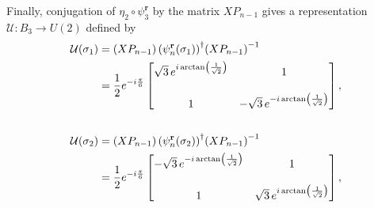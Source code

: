 \begin{example}
    Finally, conjugation of $\eta_2\circ\psi_3^\textbf{r}$ by the matrix $XP_{n-1}$ gives a representation $\mathcal{U}:B_3\to U(2)$ defined by
    \begin{align}
        \begin{split}    
        \mathcal{U}(\sigma_1) &= \left( X P_{n-1} \right){\left( \psi_n^\mathbf{r} (\sigma_1)\right)}^\dagger\iv{\left( X P_{n-1} \right)} \\
        &= \frac{1}{2}e^{-i\frac{\pi}{6}}\begin{bmatrix}
            \sqrt{3}\,e^{i\arctan\left( \frac{1}{\sqrt{2}} \right)} & 1 \\
            \\
            1 & -\sqrt{3}\,e^{-i\arctan\left( \frac{1}{\sqrt{2}} \right)}
        \end{bmatrix},\end{split} \\ 
        \nonumber \\
        \begin{split}
        \mathcal{U}(\sigma_2) &= \left( X P_{n-1} \right){\left( \psi_n^\mathbf{r} (\sigma_2)\right)}^\dagger\iv{\left( X P_{n-1} \right)} \\
        &= \frac{1}{2}e^{-i\frac{\pi}{6}}\begin{bmatrix}
            -\sqrt{3}\,e^{-i\arctan\left( \frac{1}{\sqrt{2}} \right)} & 1 \\
            \\
            1 & \sqrt{3}\,e^{i\arctan\left( \frac{1}{\sqrt{2}} \right)}
        \end{bmatrix},

\end{split}
\end{align}
\end{example}
